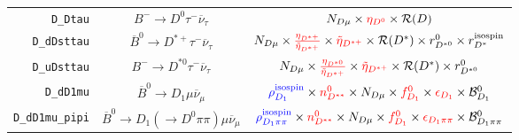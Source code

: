 \begin{landscape}
\begin{table}
\begin{tabular}{r|c|c}
         \texttt{D\_Dtau} &                   $B^- \rightarrow D^0 \tau^- \overline{\nu}_\tau$                   &                                                                                                                                                           $N_{D \mu} \times \textcolor{red}{\eta_{D^0}} \times \mathcal{R}(D)$                                                                                                                                                           \\
      \texttt{D\_dDsttau} &            $\overline{B}^0 \rightarrow D^{*+} \tau^- \overline{\nu}_\tau$            &                                                                                        $N_{D \mu} \times \textcolor{red}{\frac{\eta_{D^{*+}}}{\tilde{\eta}_{D^{*+}}}} \times \textcolor{red}{\tilde{\eta}_{D^{*+}}} \times \mathcal{R}(D^*) \times r_{D^{*0}}^{0} \times r_{D^*}^\text{isospin}$                                                                                         \\
      \texttt{D\_uDsttau} &                 $B^- \rightarrow D^{*0} \tau^- \overline{\nu}_\tau$                  &                                                                                                       $N_{D \mu} \times \textcolor{red}{\frac{\eta_{D^{*0}}}{\tilde{\eta}_{D^{*+}}}} \times \textcolor{red}{\tilde{\eta}_{D^{*+}}} \times \mathcal{R}(D^*) \times r_{D^{*0}}^{0}$                                                                                                        \\
        \texttt{D\_dD1mu} &               $\overline{B}^0 \rightarrow D_1 \mu \overline{\nu}_\mu$                &                                                                                      $\textcolor{blue}{\rho^\text{isospin}_{D_1}} \times \textcolor{red}{n^{0}_{D^{**}}} \times N_{D \mu} \times \textcolor{red}{f^{0}_{D_1}} \times \textcolor{red}{\epsilon_{D_1}} \times \mathcal{B}^{0}_{D_1}$                                                                                       \\
  \texttt{D\_dD1mu\_pipi} &   $\overline{B}^0 \rightarrow D_1 (\rightarrow D^0 \pi\pi) \mu \overline{\nu}_\mu$   &                                                                             $\textcolor{blue}{\rho^\text{isospin}_{D_1\pi\pi}} \times \textcolor{red}{n^{0}_{D^{**}}} \times N_{D \mu} \times \textcolor{red}{f^{0}_{D_1}} \times \textcolor{red}{\epsilon_{D_1\pi\pi}} \times \mathcal{B}^{0}_{D_1\pi\pi}$                                                                              \\

\end{tabular}
\end{table}
\end{landscape}
